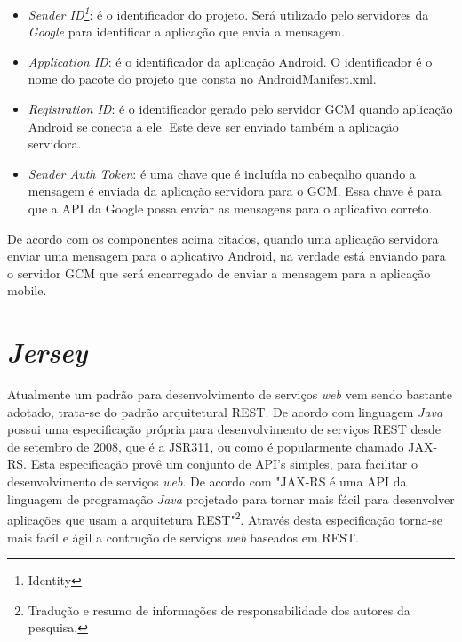 \begin{itemize}
	
	\item \textit{Sender ID\footnote{Identity}}: é o identificador do projeto.
	Será utilizado pelo servidores da \textit{Google} para identificar a aplicação
	que envia a mensagem.
	
	\item \textit{Application ID}: é o identificador da aplicação Android. O
	identificador é o nome do pacote do projeto que consta no AndroidManifest.xml.
	
	\item \textit{Registration ID}: é o identificador gerado pelo servidor GCM
	quando aplicação Android se conecta a ele. Este deve ser enviado também a
	aplicação servidora.
	
	\item \textit{Sender Auth Token}: é uma chave que é incluída no cabeçalho
	quando a mensagem é enviada da aplicação servidora para o GCM. Essa chave é
	para que a API da Google possa enviar as mensagens para o aplicativo correto.

\end{itemize}

	\par De acordo com os componentes acima citados, quando uma aplicação servidora
enviar uma mensagem para o aplicativo Android, na verdade está enviando para o
servidor GCM que será encarregado de enviar a mensagem para a aplicação mobile.

\section{\textit{Jersey}}

	\par Atualmente um padrão para desenvolvimento de serviços \textit{web} vem
sendo bastante adotado, trata-se do padrão arquitetural REST. De acordo com
 linguagem \textit{Java} possui uma especificação
própria para desenvolvimento de serviços REST desde de setembro de 2008, que é
a JSR311, ou como é popularmente chamado JAX-RS. Esta especificação provê um
conjunto de API's simples, para facilitar o desenvolvimento de serviços
\textit{web}. De acordo com  "JAX-RS é uma API da
linguagem de programação \textit{Java} projetado para tornar mais fácil para
desenvolver aplicações que usam a arquitetura REST"\footnote{Tradução e resumo
de informações de responsabilidade dos autores da pesquisa.}. Através desta
especificação torna-se mais facíl e ágil a contrução de serviços \textit{web}
baseados em REST.

